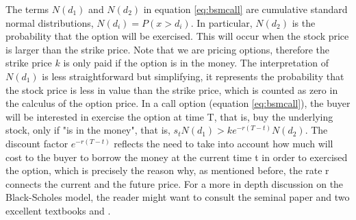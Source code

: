 \documentclass[11pt, onecolumn]{article}
\begin{document}
The terms $N(d_1)$ and $N(d_2)$ in equation \ref{eq:bsmcall} are cumulative standard normal distributions, $N(d_i) = P(x > d_i)$. In particular, $N(d_2)$ is the probability that the option will be exercised. This will occur when the stock price is larger than the strike price. Note that we are pricing options, therefore the strike price $k$ is only paid if the option is in the money. The interpretation of $N(d_1)$ is less straightforward but simplifying, it represents the probability that the stock price is less in value than the strike price, which is counted as zero in the calculus of the option price. In a call option (equation \ref{eq:bsmcall}), the buyer will be interested in exercise the option at time T, that is, buy the underlying stock, only if "is in the money", that is, $s_t N(d_1) > k e^{-r(T-t)}N(d_2)$. The discount factor $e^{-r(T-t)}$ reflects the need to take into account how much will cost to the buyer to borrow the money at the current time t in order to exercised the option, which is precisely the reason why, as mentioned before, the rate r connects the current and the future price. For a more in depth discussion on the Black-Scholes model, the reader might want to consult the seminal paper \citep{black_pricing_1973} and two excellent textbooks \citep{hull_options_2005} and \citep{duffie_dynamic_2001}.

\end{document}
